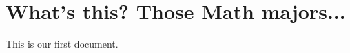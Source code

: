 \documentclass{article}
\begin{document}
\author{Super Saiyan}
\date{January 5, 2011}
\section{What's this? \textsf Those Math majors...}
This is our first document.
\end{document}
